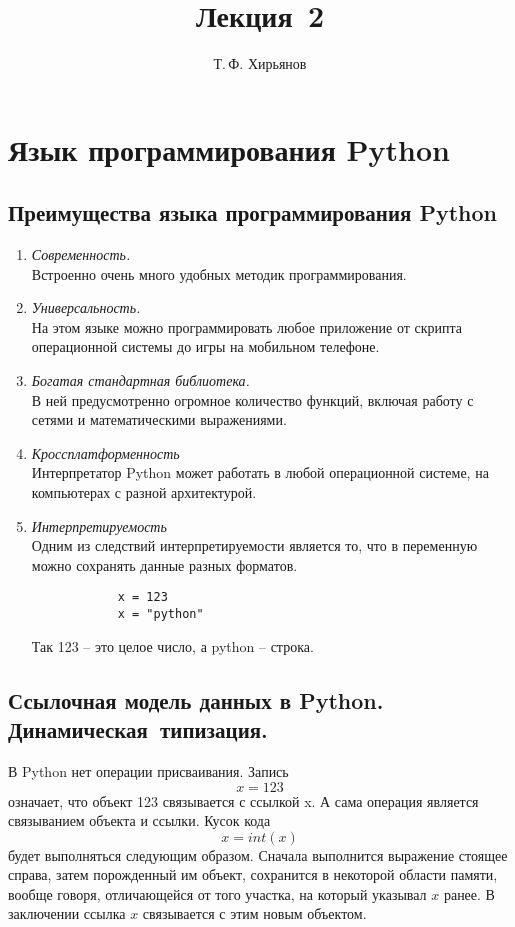 \documentclass[a4paper, fleqn]{article}
\title{Лекция \textnumero\,2}
\author{Т.\,Ф. Хирьянов}
\date{}
\begin{document}
	\maketitle
	\section*{Язык программирования Python}
	\subsection*{Преимущества языка программирования Python}
		
		\begin{enumerate}
			\item \emph{Современность.}\\
			Встроенно очень много удобных методик программирования.
			
			\item \emph{Универсальность.}\\			
			На этом языке можно программировать любое приложение от скрипта операционной системы до игры на мобильном телефоне.
			
			\item \emph{Богатая стандартная библиотека.}\\			
			В ней предусмотренно огромное количество функций, включая работу с сетями и математическими выражениями.
			
			\item \emph{Кроссплатформенность}\\			
			Интерпретатор Python может работать в любой операционной системе, на компьютерах с разной архитектурой.
			
			\item \emph{Интерпретируемость}\\			
			Одним из следствий интерпретируемости является то, что в переменную можно сохранять данные разных форматов. 
			\begin{lstlisting}
			x = 123		
			x = "python" 	
			\end{lstlisting}
			Так 123 -- это целое число, а python -- строка.
		\end{enumerate}
		
	\subsection* {Ссылочная модель данных в Python. Динамическая~типизация.}
	
		В Python нет операции присваивания. Запись
		\[x = 123\]
		означает, что объект 123 связывается с ссылкой x. А сама операция является связыванием объекта и ссылки.
		Кусок кода
		\[x = int(x)\]
		будет выполняться следующим образом. Сначала выполнится выражение стоящее справа, затем порожденный им объект, сохранится в некоторой области памяти, вообще говоря, отличающейся от того участка, на который указывал $x$ ранее. В заключении ссылка $x$ связывается с этим новым объектом.
		
\end{document}
